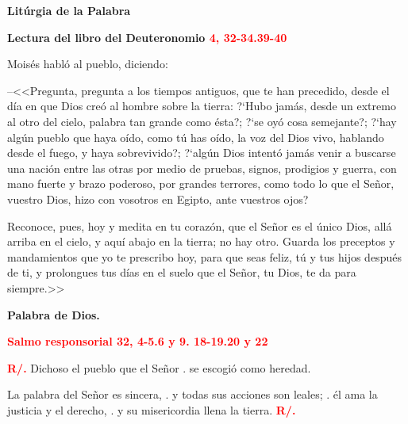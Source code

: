 \documentclass[12pt, letterpaper, spanish]{report}
\begin{document}
\newpage

\begin{center}
\Huge {\bfseries Lit\'urgia de la Palabra}
\end{center}

\Large {\bfseries Lectura del libro del Deuteronomio \hspace{1cm} \textcolor{red}{4, 32-34.39-40}} \newline

\Large Mois\'es habl\'o al pueblo, diciendo: \newline

--<<Pregunta, pregunta a los tiempos antiguos, que te han precedido, desde el d\'ia en que Dios
cre\'o al hombre sobre la tierra: ?`Hubo jam\'as, desde un extremo al otro del cielo, palabra tan
grande como \'esta?; ?`se oy\'o cosa semejante?; ?`hay alg\'un pueblo que haya o\'ido, como t\'u has
o\'ido, la voz del Dios vivo, hablando desde el fuego, y haya sobrevivido?; ?`alg\'un Dios intent\'o
jam\'as venir a buscarse una naci\'on entre las otras por medio de pruebas, signos, prodigios y
guerra, con mano fuerte y brazo poderoso, por grandes terrores, como todo lo que el Se\~nor, vuestro
Dios, hizo con vosotros en Egipto, ante vuestros ojos? \newline

Reconoce, pues, hoy y medita en tu coraz\'on, que el Se\~nor es el \'unico Dios, all\'a arriba en el
cielo, y aqu\'i abajo en la tierra; no hay otro. Guarda los preceptos y mandamientos que yo te
prescribo hoy, para que seas feliz, t\'u y tus hijos despu\'es de ti, y prolongues tus d\'ias en el
suelo que el Se\~nor, tu Dios, te da para siempre.>> \newline

{\bfseries Palabra de Dios.} \newline

\newpage

\Large {\bfseries \textcolor{red}{Salmo responsorial \hspace{1cm} 32, 4-5.6 y 9. 18-19.20 y 22}} \newline

\Large {\bfseries \textcolor{red}{R/.}} \hspace{1cm} Dichoso el pueblo que el Se\~nor \newline
. \hspace{3cm} se escogi\'o como heredad. \newline

\hspace{2cm} La palabra del Se\~nor es sincera, \newline
. \hspace{2.5cm} y todas sus acciones son leales; \newline
. \hspace{2.5cm} \'el ama la justicia y el derecho, \newline
. \hspace{2.5cm} y su misericordia llena la tierra. \hspace{1cm} {\bfseries \textcolor{red}{R/.}} \newline
\end{document}
